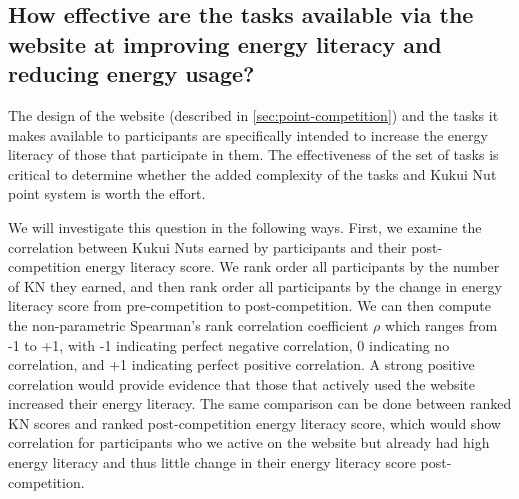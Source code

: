 %

\subsection[How effective were the tasks available via the website?]{How effective are the tasks available via the website at improving energy literacy and reducing energy usage?}
\label{sec:task-effectiveness}

The design of the website (described in \autoref{sec:point-competition}) and the tasks it makes available to participants are specifically intended to increase the energy literacy of those that participate in them. The effectiveness of the set of tasks is critical to determine whether the added complexity of the tasks and Kukui Nut point system is worth the effort.

We will investigate this question in the following ways. First, we examine the correlation between Kukui Nuts earned by participants and their post-competition energy literacy score. We rank order all participants by the number of KN they earned, and then rank order all participants by the change in energy literacy score from pre-competition to post-competition. We can then compute the non-parametric Spearman's rank correlation coefficient $\rho$ which ranges from -1 to +1, with -1 indicating perfect negative correlation, 0 indicating no correlation, and +1 indicating perfect positive correlation. A strong positive correlation would provide evidence that those that actively used the website increased their energy literacy. The same comparison can be done between ranked KN scores and ranked post-competition energy literacy score, which would show correlation for participants who we active on the website but already had high energy literacy and thus little change in their energy literacy score post-competition.

